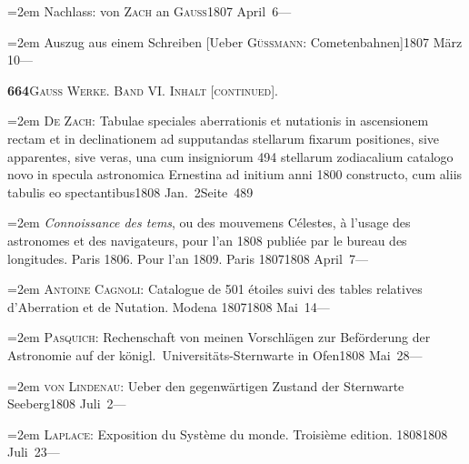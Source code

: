 \documentclass[12pt,a4paper]{article}
\begin{document}
{{{{{{{{{{{\vspace{0.5mm}
\noindent\hangindent=2em
Nachlass: von \textsc{Zach} an \textsc{Gauss}\hfill 1807 April\ 6\quad ---

\vspace{0.5mm}
\noindent\hangindent=2em
Auszug aus einem Schreiben [Ueber \textsc{G\"ussmann}: Cometenbahnen]\hfill 1807 M\"arz 10\quad ---

\newpage

\begin{center}\small\textbf{664}\quad\textsc{Gauss Werke. Band VI. Inhalt [continued].}\end{center}

\vspace{0.3cm}

{\small
\noindent\hangindent=2em
\textsc{De Zach}: Tabulae speciales aberrationis et nutationis in ascensionem rectam et in declinationem ad supputandas stellarum fixarum positiones, sive apparentes, sive veras, una cum insigniorum 494 stellarum zodiacalium catalogo novo in specula astronomica Ernestina ad initium anni 1800 constructo, cum aliis tabulis eo spectantibus\hfill 1808 Jan.\ 2\quad Seite\ 489

\vspace{0.5mm}
\noindent\hangindent=2em
\textit{Connoissance des tems}, ou des mouvemens C\'elestes, \`a l'usage des astronomes et des navigateurs, pour l'an 1808 publi\'ee par le bureau des longitudes. Paris 1806. Pour l'an 1809. Paris 1807\hfill 1808 April\ 7\quad ---

\vspace{0.5mm}
\noindent\hangindent=2em
\textsc{Antoine Cagnoli}: Catalogue de 501 \'etoiles suivi des tables relatives d'Aberration et de Nutation. Modena 1807\hfill 1808 Mai\ 14\quad ---

\vspace{0.5mm}
\noindent\hangindent=2em
\textsc{Pasquich}: Rechenschaft von meinen Vorschl\"agen zur Bef\"orderung der Astronomie auf der k\"onigl.\ Universit\"ats-Sternwarte in Ofen\hfill 1808 Mai\ 28\quad ---

\vspace{0.5mm}
\noindent\hangindent=2em
\textsc{von Lindenau}: Ueber den gegenw\"artigen Zustand der Sternwarte Seeberg\hfill 1808 Juli\ 2\quad ---

\vspace{0.5mm}
\noindent\hangindent=2em
\textsc{Laplace}: Exposition du Syst\`eme du monde. Troisi\`eme edition. 1808\hfill 1808 Juli\ 23\quad ---

}}}}}}}}}}}}
\end{document}
